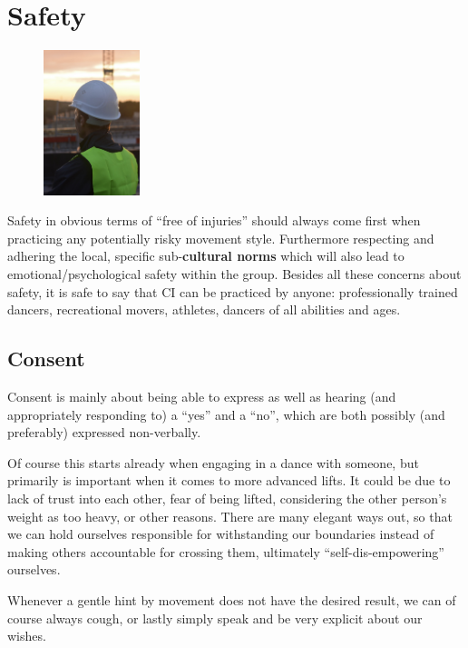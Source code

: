 \section{Safety}\label{sec:safety}

\begin{figure}
    \centering
    \includegraphics[width=0.25\textwidth]{images/safety}
\end{figure}

Safety in obvious terms of ``free of injuries'' should always come first when practicing any potentially risky movement style.
Furthermore respecting and adhering the local, specific sub-\textbf{cultural norms} which will also lead to emotional/psychological safety within the group.
Besides all these concerns about safety, it is safe to say that CI can be practiced by anyone: professionally trained dancers, recreational movers, athletes, dancers of all abilities and ages.

\subsection{Consent}\label{subsec:consent}

Consent is mainly about being able to express as well as hearing (and appropriately responding to) a ``yes'' and a ``no'', which are both possibly (and preferably) expressed non-verbally.

Of course this starts already when engaging in a dance with someone, but primarily is important when it comes to more advanced lifts.
It could be due to lack of trust into each other, fear of being lifted, considering the other person's weight as too heavy, or other reasons.
There are many elegant ways out, so that we can hold ourselves responsible for withstanding our boundaries instead of making others accountable for crossing them, ultimately ``self-dis-empowering'' ourselves.

Whenever a gentle hint by movement does not have the desired result, we can of course always cough, or lastly simply speak and be very explicit about our wishes.

